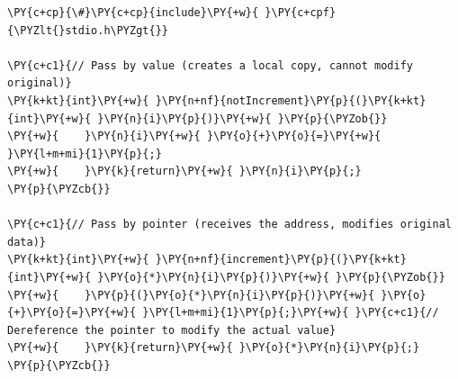 \begin{Verbatim}[label=\makebox{\url{https://github.com/lucabaldini/cmepda/tree/master/slides/latex/snippets/pointers.c}},commandchars=\\\{\}]
\PY{c+cp}{\#}\PY{c+cp}{include}\PY{+w}{ }\PY{c+cpf}{\PYZlt{}stdio.h\PYZgt{}}

\PY{c+c1}{// Pass by value (creates a local copy, cannot modify original)}
\PY{k+kt}{int}\PY{+w}{ }\PY{n+nf}{notIncrement}\PY{p}{(}\PY{k+kt}{int}\PY{+w}{ }\PY{n}{i}\PY{p}{)}\PY{+w}{ }\PY{p}{\PYZob{}}
\PY{+w}{    }\PY{n}{i}\PY{+w}{ }\PY{o}{+}\PY{o}{=}\PY{+w}{ }\PY{l+m+mi}{1}\PY{p}{;}
\PY{+w}{    }\PY{k}{return}\PY{+w}{ }\PY{n}{i}\PY{p}{;}
\PY{p}{\PYZcb{}}

\PY{c+c1}{// Pass by pointer (receives the address, modifies original data)}
\PY{k+kt}{int}\PY{+w}{ }\PY{n+nf}{increment}\PY{p}{(}\PY{k+kt}{int}\PY{+w}{ }\PY{o}{*}\PY{n}{i}\PY{p}{)}\PY{+w}{ }\PY{p}{\PYZob{}}
\PY{+w}{    }\PY{p}{(}\PY{o}{*}\PY{n}{i}\PY{p}{)}\PY{+w}{ }\PY{o}{+}\PY{o}{=}\PY{+w}{ }\PY{l+m+mi}{1}\PY{p}{;}\PY{+w}{ }\PY{c+c1}{// Dereference the pointer to modify the actual value}
\PY{+w}{    }\PY{k}{return}\PY{+w}{ }\PY{o}{*}\PY{n}{i}\PY{p}{;}
\PY{p}{\PYZcb{}}


\end{Verbatim}
